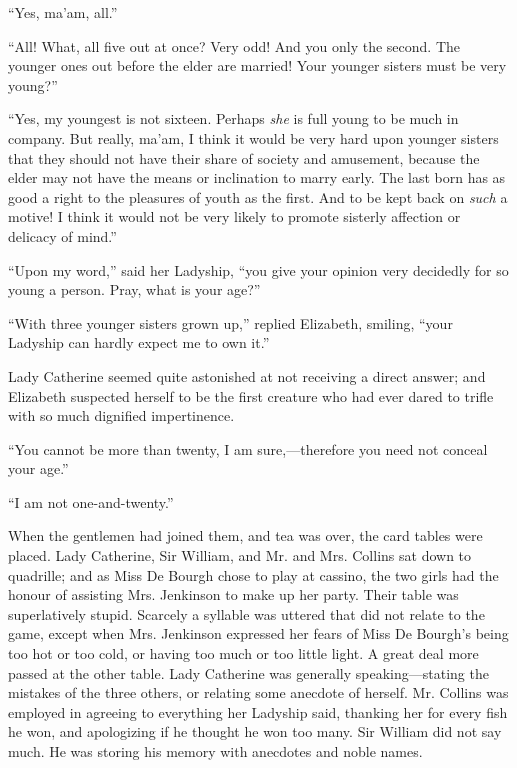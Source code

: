\documentclass[12pt]{book}
\begin{document}
``Yes, ma'am, all.''

``All! What, all five out at once? Very odd! And you only the second. The younger ones out before the elder are married! Your younger sisters must be very young?''

``Yes, my youngest is not sixteen. Perhaps \textit{she} is full young to be much in company. But really, ma'am, I think it would be very hard upon younger sisters that they should not have their share of society and amusement, because the elder may not have the means or inclination to marry early. The last born has as good a right to the pleasures of youth as the first. And to be kept back on \textit{such} a motive! I think it would not be very likely to promote sisterly affection or delicacy of mind.''

``Upon my word,'' said her Ladyship, ``you give your opinion very decidedly for so young a person. Pray, what is your age?''

``With three younger sisters grown up,'' replied Elizabeth, smiling, ``your Ladyship can hardly expect me to own it.''

Lady Catherine seemed quite astonished at not receiving a direct answer; and Elizabeth suspected herself to be the first creature who had ever dared to trifle with so much dignified impertinence.

``You cannot be more than twenty, I am sure,---therefore you need not conceal your age.''

``I am not one-and-twenty.''

When the gentlemen had joined them, and tea was over, the card tables were placed. Lady Catherine, Sir William, and Mr. and Mrs. Collins sat down to quadrille; and as Miss De Bourgh chose to play at cassino, the two girls had the honour of assisting Mrs. Jenkinson to make up her party. Their table was superlatively stupid. Scarcely a syllable was uttered that did not relate to the game, except when Mrs. Jenkinson expressed her fears of Miss De Bourgh's being too hot or too cold, or having too much or too little light. A great deal more passed at the other table. Lady Catherine was generally speaking---stating the mistakes of the three others, or relating some anecdote of herself. Mr. Collins was employed in agreeing to everything her Ladyship said, thanking her for every fish he won, and apologizing if he thought he won too many. Sir William did not say much. He was storing his memory with anecdotes and noble names.
\end{document}
